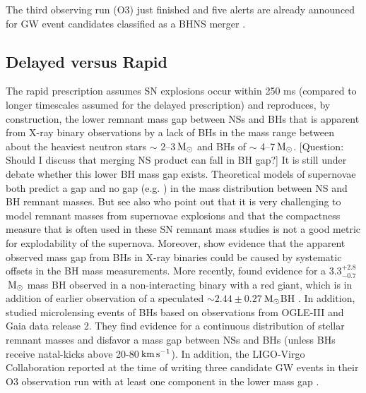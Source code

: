 \documentclass[twocolumn]{aastex63}
\newcommand{\question}[1]{\textcolor{OliveGreen}{[Question: #1]}}
\newcommand\bhnsSingle{BHNS\xspace}
\newcommand{\kms}{\ensuremath{\,\rm{km}\,\rm{s}^{-1}}\xspace}
\newcommand{\Msun}{\ensuremath{\,\rm{M}_{\odot}}\xspace}
\begin{document}
The third observing run (O3) just finished and five alerts are already announced for \ac{GW} event candidates classified as a \bhnsSingle merger \citep[see the GCN alerts  by][]{GCNS190814bv,GCNS190910d,GCNS190923y, GCNS190930t,GCNS191205ah}.  

\subsection{Delayed versus Rapid}
\label{subsec:discussion-delayed-vs-rapid-SN-remnant-mass}

The {rapid} prescription assumes \ac{SN}  explosions occur within 250 ms (compared to longer timescales assumed for the delayed prescription) and reproduces, by construction,  the  lower remnant mass gap between NSs and BHs that is apparent from  X-ray binary observations 
\citep{1998ApJ...499..367B, 2010ApJ...725.1918O, 2011APS..APRH11002F} by a lack of BHs in the mass range between about the heaviest neutron stars  $\sim$ 2--3\Msun \citep{2016ARA&A..54..401O, 2017ApJ...850L..19M, 2019NatAs.tmp..439C,2019arXiv190801012T,2020arXiv200106102S} and  BHs of $\sim$ 4--7\Msun. \question{Should I discuss that  merging \ac{NS} product can fall in \ac{BH} gap?} %
% 
	It is still under debate whether this lower \ac{BH} mass gap exists. Theoretical models of supernovae both predict a gap \citep{2014ApJ...785...28K,2015ApJ...801...90P} and no  gap (e.g. \citealt{1995ApJS..101..181W,2001ApJ...554..548F,2019arXiv191001641E, 2020arXiv200304320C})  in the mass distribution between \ac{NS} and \ac{BH} remnant masses. But see also \citet{2020MNRAS.491.2715B} who point out that it is very challenging to model remnant masses from supernovae explosions and that the compactness measure that is often used in these \ac{SN}  remnant mass studies is not a good metric for explodability of the supernova. 
	Moreover, \citet{2012ApJ...757...36K}   show evidence that the apparent observed mass gap from BHs in X-ray binaries could be caused by systematic offsets in the \ac{BH} mass measurements.  
	More recently, \citet{2019Sci...366..637T} found evidence for a $3.3_{-0.7}^{+2.8}$\Msun mass \ac{BH} observed in a non-interacting binary with a red giant, which is in addition of earlier observation of a speculated $\sim 2.44\pm0.27$\Msun \ac{BH} \citep{2002A&A...392..909C,2010AAS...21541905R,2011arXiv1107.1537D}. 
	In addition,  \citet{2016MNRAS.458.3012W,2019arXiv190407789W} studied microlensing events of BHs based on  observations from OGLE-III and Gaia data release 2.  
	They find evidence for a continuous distribution of stellar remnant masses and disfavor a mass gap between NSs and BHs (unless BHs receive natal-kicks above 20-80\kms).   
	In addition, the LIGO-Virgo Collaboration reported at the time of writing three candidate \ac{GW} events in their O3 observation run with at least one component in the lower mass gap \citep{GCNS190924h,GCNS190930s,GCNSS200115j}.	
	
\end{document}
